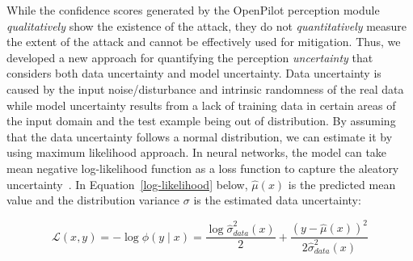 While the confidence scores generated by the OpenPilot perception module \emph{qualitatively} show the existence of the attack, they do not \emph{quantitatively} measure the extent of the attack and cannot be effectively used for mitigation. Thus, we developed a new approach for quantifying the perception \emph{uncertainty} that considers both data uncertainty and model uncertainty.
Data uncertainty is caused by the input noise/disturbance and intrinsic randomness of the real data while model uncertainty results from a lack of training data in certain areas of the input domain and the test example being out of distribution.  By assuming that the data uncertainty follows a normal distribution, we can estimate it by using maximum likelihood approach. In neural networks, the model can take mean negative log-likelihood function 
as a loss function to capture the aleatory uncertainty~\cite{kendall2017uncertainties}. In Equation~\eqref{log-likelihood} below, $\hat{\mu}(x)$ is the predicted mean value and the distribution variance $\sigma$ is the estimated data uncertainty:

\begin{equation}
\mathcal{L}(x, y)=-\log \phi(y \mid x)=\frac{\log \hat{\sigma}^{2}_{data}(x)}{2}+\frac{(y-\hat{\mu}(x))^{2}}{2 \hat{\sigma}^{2}_{data}(x)}\label{log-likelihood}
\end{equation}

